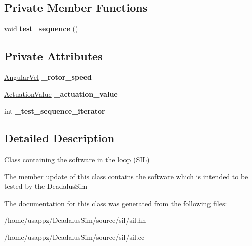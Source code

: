 \subsection*{\-Private \-Member \-Functions}
\begin{DoxyCompactItemize}
\item 
\hypertarget{classstd_1_1SIL_ad2aea8d97e12b77f5438d40b91514336}{void {\bfseries test\-\_\-sequence} ()}\label{classstd_1_1SIL_ad2aea8d97e12b77f5438d40b91514336}

\end{DoxyCompactItemize}
\subsection*{\-Private \-Attributes}
\begin{DoxyCompactItemize}
\item 
\hypertarget{classstd_1_1SIL_af291402f740ff61918e3db77d8d6a206}{\hyperlink{classAngularVel}{\-Angular\-Vel} {\bfseries \-\_\-rotor\-\_\-speed}}\label{classstd_1_1SIL_af291402f740ff61918e3db77d8d6a206}

\item 
\hypertarget{classstd_1_1SIL_a20422ec82b78b71549270afb06e76aa1}{\hyperlink{classActuationValue}{\-Actuation\-Value} {\bfseries \-\_\-actuation\-\_\-value}}\label{classstd_1_1SIL_a20422ec82b78b71549270afb06e76aa1}

\item 
\hypertarget{classstd_1_1SIL_a82e572d7374e596251d803cc8cb17ac4}{int {\bfseries \-\_\-test\-\_\-sequence\-\_\-iterator}}\label{classstd_1_1SIL_a82e572d7374e596251d803cc8cb17ac4}

\end{DoxyCompactItemize}


\subsection{\-Detailed \-Description}
\-Class containing the software in the loop (\hyperlink{classstd_1_1SIL}{\-S\-I\-L}) 

\-The member update of this class contains the software which is intended to be tested by the \-Deadalus\-Sim 

\-The documentation for this class was generated from the following files\-:\begin{DoxyCompactItemize}
\item 
/home/usappz/\-Deadalus\-Sim/source/sil/sil.\-hh\item 
/home/usappz/\-Deadalus\-Sim/source/sil/sil.\-cc\end{DoxyCompactItemize}
